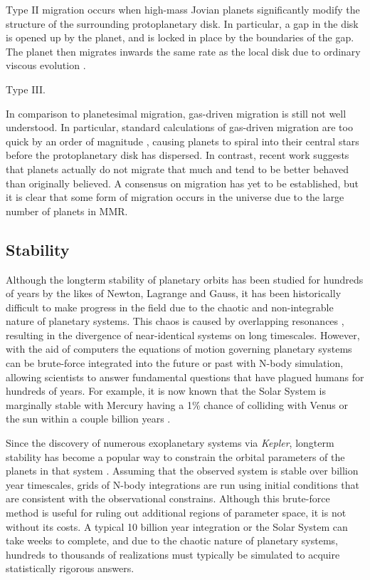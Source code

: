 \documentclass[12pt,letter]{aastex}
\newcommand{\kep}{{\it Kepler}\xspace}
\begin{document}
Type II migration occurs when high-mass Jovian planets significantly modify the structure of the surrounding protoplanetary disk. 
In particular, a gap in the disk is opened up by the planet, and is locked in place by the boundaries of the gap.
The planet then migrates inwards the same rate as the local disk due to ordinary viscous evolution \citep{Armitage2010}.  

Type III. 

In comparison to planetesimal migration, gas-driven migration is still not well understood. 
In particular, standard calculations of gas-driven migration are too quick by an order of magnitude \citep{Lin1986, Tanaka2002}, causing planets to spiral into their central stars before the protoplanetary disk has dispersed.
In contrast, recent work \citep{Fung2017} suggests that planets actually do not migrate that much and tend to be better behaved than originally believed. 
A consensus on migration has yet to be established, but it is clear that some form of migration occurs in the universe due to the large number of planets in MMR.

\subsection{Stability}
Although the longterm stability of planetary orbits has been studied for hundreds of years by the likes of Newton, Lagrange and Gauss, it has been historically difficult to make progress in the field due to the chaotic and non-integrable nature of planetary systems.  
This chaos is caused by overlapping resonances \citep{Chirikov1979, Lecar2001}, resulting in the divergence of near-identical systems on long timescales. 
However, with the aid of computers the equations of motion governing planetary systems can be brute-force integrated into the future or past with N-body simulation, allowing scientists to answer fundamental questions that have plagued humans for hundreds of years. 
For example, it is now known that the Solar System is marginally stable \citep{Sussman1988, Laskar1994, Lecar2001} with Mercury having a 1\% chance of colliding with Venus or the sun within a couple billion years \citep{Laskar2009}.

Since the discovery of numerous exoplanetary systems via \kep, longterm stability has become a popular way to constrain the orbital parameters of the planets in that system \citep{Lissauer2011, Steffen2013, Jontof-Hutter2014, Tamayo2015}. 
Assuming that the observed system is stable over billion year timescales, grids of N-body integrations are run using initial conditions that are consistent with the observational constrains. 
Although this brute-force method is useful for ruling out additional regions of parameter space, it is not without its costs. 
A typical 10 billion year integration or the Solar System can take weeks to complete, and due to the chaotic nature of planetary systems, hundreds to thousands of realizations must typically be simulated to acquire statistically rigorous answers. 



\end{document}
